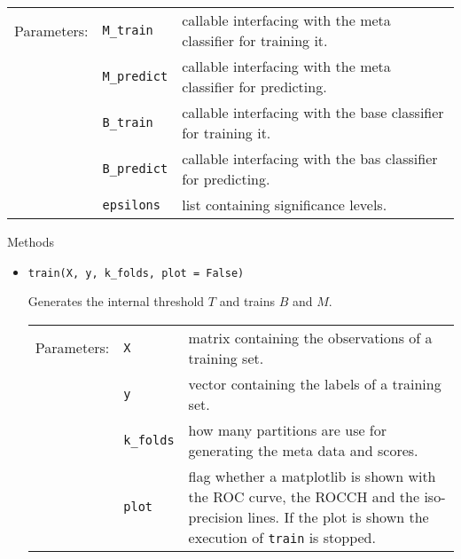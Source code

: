 \documentclass[twoside,11pt]{article}
\begin{document}
\begin{appendices}
      \begin{tabu}{llX}
        Parameters: &\texttt{M\_train}
                    &callable interfacing with the meta
                     classifier for training it.
                     \\
                    &\texttt{M\_predict}
                    &callable interfacing with the meta
                     classifier for predicting.
                     \\
                    &\texttt{B\_train}
                    &callable interfacing with the base
                     classifier for training it.
                     \\
                    &\texttt{B\_predict}
                    &callable interfacing with the bas
                     classifier for predicting.
                     \\
                    &\texttt{epsilons}
                    &list containing significance levels.
      \end{tabu}

      Methods

      \begin{itemize}

        \item
          \texttt{train(X, y, k\_folds, plot = False)}

          Generates the internal threshold $T$ and trains
          $B$ and $M$.
          \\

          \begin{tabu}{llX}
            Parameters: &\texttt{X}
                        &matrix containing the observations
                         of a training set.
                         \\
                        &\texttt{y}
                        &vector containing the labels of a
                         training set.
                         \\
                        &\texttt{k\_folds}
                        &how many partitions are use for
                         generating the meta data and
                         scores.
                         \\
                        &\texttt{plot}
                        &flag whether a matplotlib
                         \citep[see][]{hunter_2007} is
                         shown with the ROC curve, the
                         ROCCH and the iso-precision lines.
                         If the plot is shown the execution
                         of \texttt{train} is stopped.
          \end{tabu}


\end{itemize}
\end{appendices}
\end{document}
